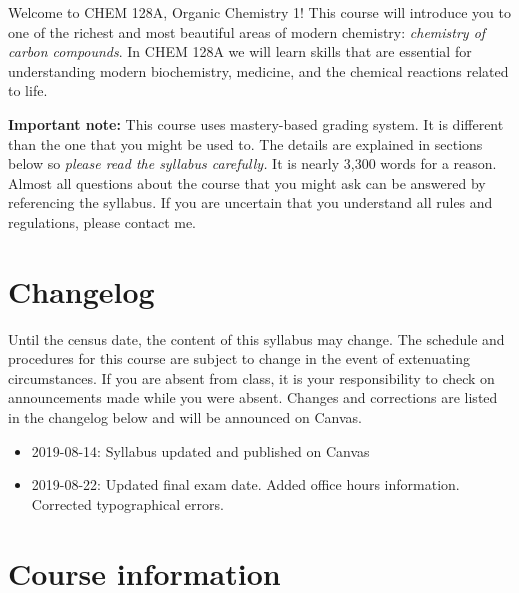 \newpage

Welcome to CHEM 128A, Organic Chemistry 1! This course will introduce
you to one of the richest and most beautiful areas of modern chemistry:
\emph{chemistry of carbon compounds}. In CHEM 128A we will learn skills
that are essential for understanding modern biochemistry, medicine, and
the chemical reactions related to life.

\textbf{Important note:} This course uses mastery-based grading system.
It is different than the one that you might be used to. The details are
explained in sections below so \emph{please read the syllabus
carefully.} It is nearly 3,300 words for a reason. Almost all questions
about the course that you might ask can be answered by referencing the
syllabus. If you are uncertain that you understand all rules and
regulations, please contact me.

\hypertarget{changelog}{%
\section{Changelog}\label{changelog}}

Until the census date, the content of this syllabus may change. The
schedule and procedures for this course are subject to change in the
event of extenuating circumstances. If you are absent from class, it is
your responsibility to check on announcements made while you were
absent. Changes and corrections are listed in the changelog below and
will be announced on Canvas.

\begin{itemize}
\tightlist
\item
  2019-08-14: Syllabus updated and published on Canvas
\item
  2019-08-22: Updated final exam date. Added office hours information.
  Corrected typographical errors.
\end{itemize}

\hypertarget{course-information}{%
\section{Course information}\label{course-information}}

